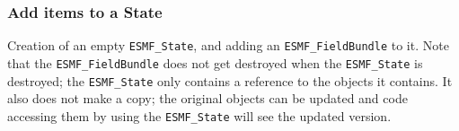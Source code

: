  
\setlength{\oldparskip}{\parskip}
\setlength{\parskip}{1.5ex}
\setlength{\oldparindent}{\parindent}
\setlength{\parindent}{0pt}
\setlength{\oldbaselineskip}{\baselineskip}
\setlength{\baselineskip}{11pt}
 
\def\bv{\begin{verbatim}}
\def\ev{\end{verbatim}}
\def\be{\begin{equation}}
\def\ee{\end{equation}}
\def\bea{\begin{eqnarray}}
\def\eea{\end{eqnarray}}
\def\bi{\begin{itemize}}
\def\ei{\end{itemize}}
\def\bn{\begin{enumerate}}
\def\en{\end{enumerate}}
\def\bd{\begin{description}}
\def\ed{\end{description}}
\def\({\left (}
\def\){\right )}
\def\[{\left [}
\def\]{\right ]}
\def\<{\left  \langle}
\def\>{\right \rangle}
\def\cI{{\cal I}}
\def\diag{\mathop{\rm diag}}
\def\tr{\mathop{\rm tr}}


 

  \subsubsection{Add items to a State}
     
    Creation of an empty {\tt ESMF\_State}, and adding an {\tt ESMF\_FieldBundle}
    to it.  Note that the {\tt ESMF\_FieldBundle} does not get destroyed when
    the {\tt ESMF\_State} is destroyed; the {\tt ESMF\_State} only contains
    a reference to the objects it contains.  It also does not make a copy;
    the original objects can be updated and code accessing them by using
    the {\tt ESMF\_State} will see the updated version. 

